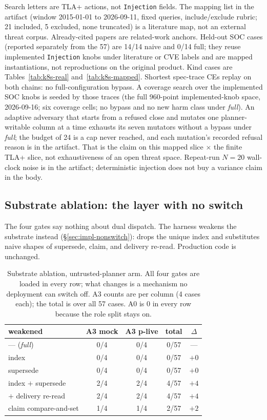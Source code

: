 \documentclass[acmsmall,manuscript,review,anonymous]{acmart}
\renewcommand{\_}{\discretionary{\textunderscore}{}{\textunderscore}}
\begin{document}
Search letters are TLA+ actions, not \texttt{Injection} fields. The
mapping list in the artifact (window 2015-01-01 to
2026-09-11, fixed queries, include/exclude rubric; 21 included, 5
excluded, none truncated) is a literature map, not an external threat
corpus.
Already-cited papers are related-work anchors. Held-out
{SOC} cases (reported separately from the 57) are 14/14 naive and 0/14 full;
they reuse implemented \texttt{Injection} knobs under literature or {CVE}
labels and are mapped instantiations, not reproductions on the original
product. Kind cases are
Tables~\ref{tab:k8s-real} and~\ref{tab:k8s-mapped}. Shortest
spec-trace {CEs} replay on both chains: no full-configuration bypass. A
coverage search over the implemented {SOC} knobs is seeded by those traces
(the full 960-point implemented-knob space, 2026-09-16; six coverage
cells; no bypass and no new harm class under \emph{full}). An adaptive
adversary that starts from a refused close and mutates one
planner-writable column at a time exhausts its seven mutators without a
bypass under \emph{full}; the budget of 24 is a cap never reached, and
each mutation's recorded refusal reason is in the artifact. That is the
claim on this mapped slice $\times$ the finite {TLA+} slice, not
exhaustiveness of an open threat space.
Repeat-run $N=20$ wall-clock noise is in the artifact;
deterministic injection does not buy a variance claim in the body.

\subsection{Substrate ablation: the layer with no switch}
\label{sec:eval-substrate}

The four gates say nothing about dual dispatch. The harness weakens the
substrate instead (\S\ref{sec:impl-nonswitch}): drops the unique index
and substitutes naive shapes of supersede, claim, and delivery
re-read. Production code is unchanged.

\begin{table}[t]
\centering
\small
\caption{Substrate ablation, untrusted-planner arm. All four gates are loaded in
every row; what changes is a mechanism no deployment can switch off. A3 counts
are per column (4 cases each); the total is over all 57 cases. A0 is 0 in every row
because the role split stays on.}
\label{tab:substrate}
\begin{tabular}{@{}lcccc@{}}
\hline
weakened & A3 mock & A3 p-live & total & $\Delta$\\
\hline
--- (\emph{full})                  & 0/4 & 0/4 & 0/57 & ---\\
index                              & 0/4 & 0/4 & 0/57 & $+0$\\
supersede                          & 0/4 & 0/4 & 0/57 & $+0$\\
index $+$ supersede                & 2/4 & 2/4 & 4/57 & $+4$\\
\quad $+$ delivery re-read         & 2/4 & 2/4 & 4/57 & $+4$\\
claim compare-and-set              & 1/4 & 1/4 & 2/57 & $+2$\\
\hline
\end{tabular}
\end{table}
\end{document}
